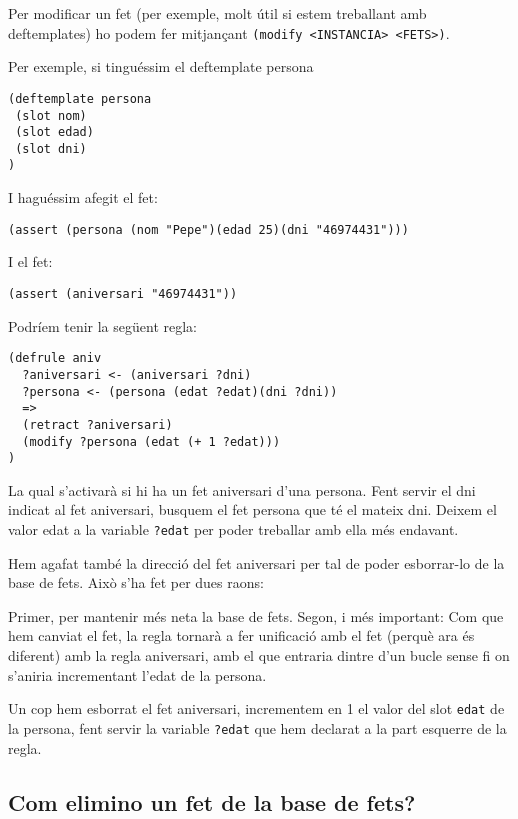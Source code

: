 \documentclass[11pt,svgnames]{scrbook}
\begin{document}
Per modificar un fet (per exemple, molt útil si estem treballant amb deftemplates) ho podem fer mitjançant \texttt{(modify <INSTANCIA> <FETS>)}.

Per exemple, si tinguéssim el deftemplate persona

\begin{verbatim}
(deftemplate persona
 (slot nom)
 (slot edad)
 (slot dni)
) \end{verbatim}

I haguéssim afegit el fet:

\begin{verbatim}
(assert (persona (nom "Pepe")(edad 25)(dni "46974431")))\end{verbatim}

I el fet:

\begin{verbatim}
(assert (aniversari "46974431"))
\end{verbatim}

Podríem tenir la següent regla:

\begin{verbatim}
(defrule aniv
  ?aniversari <- (aniversari ?dni)
  ?persona <- (persona (edat ?edat)(dni ?dni))
  =>
  (retract ?aniversari)
  (modify ?persona (edat (+ 1 ?edat)))
)
\end{verbatim}

La qual s'activarà si hi ha un fet aniversari d'una persona. Fent servir el dni indicat al fet
aniversari, busquem el fet persona que té el mateix dni. Deixem el valor edat a la variable
\texttt{?edat} per poder treballar amb ella més endavant.

Hem agafat també la direcció del fet aniversari per tal de poder esborrar-lo de la base de fets. Això s'ha fet per dues raons:

Primer, per mantenir més neta la base de fets.
Segon, i més important: Com que hem canviat el fet, la regla tornarà a fer unificació amb el fet
(perquè ara és diferent) amb la regla aniversari, amb el que entraria dintre d'un bucle sense fi on
s'aniria incrementant l'edat de la persona.

Un cop hem esborrat el fet aniversari, incrementem en 1 el valor del slot \texttt{edat} de  la
persona, fent servir la variable \texttt{?edat} que hem declarat a la part esquerre de la regla.

\subsection{Com elimino un fet de la base de fets?}
\end{document}
